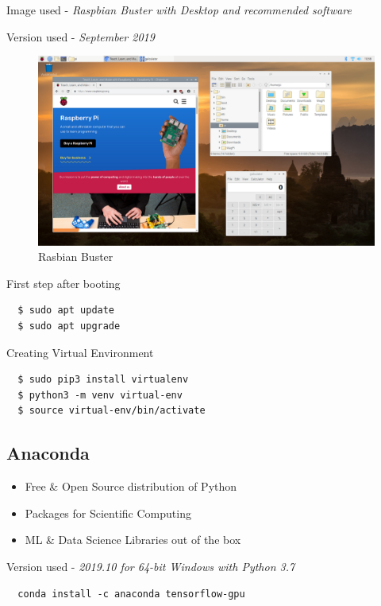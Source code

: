 Image used - \textit{Raspbian Buster with Desktop and recommended software}

Version used - \textit{September 2019}

\begin{figure}[H]
\centering
\includegraphics[width = \textwidth]{project/images/raspbian.png}
\caption{Rasbian Buster}
\end{figure}

First step after booting 

\begin{verbatim}
  $ sudo apt update
  $ sudo apt upgrade
\end{verbatim}

Creating Virtual Environment

\begin{verbatim}
  $ sudo pip3 install virtualenv
  $ python3 -m venv virtual-env
  $ source virtual-env/bin/activate
\end{verbatim}

\newpage
\subsection{Anaconda}
\begin{itemize}
    \item Free \& Open Source distribution of Python
    \item Packages for Scientific Computing
    \item ML \& Data Science Libraries out of the box
\end{itemize}

Version used - \textit{2019.10 for 64-bit Windows with Python 3.7}

\begin{verbatim}
  conda install -c anaconda tensorflow-gpu
\end{verbatim}

